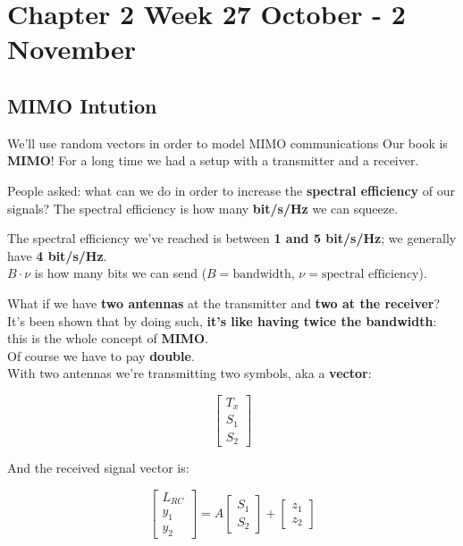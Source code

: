 \documentclass[a4paper, 11pt]{book}
\begin{document}
\setcounter{chapter}{1}
\chapter{Chapter 2 Week 27 October - 2 November}

\section{MIMO Intution}
We'll use random vectors in order to model MIMO communications
Our book is \textbf{MIMO}! For a long time we had a setup with a transmitter and a receiver.

People asked: what can we do in order to increase the \textbf{spectral efficiency} of our signals? The spectral efficiency is how many \textbf{bit/s/Hz} we can squeeze.

\noindent
\begin{minipage}{\linewidth}
\colorbox{green!20}{
\begin{minipage}{\dimexpr\linewidth-2\fboxsep\relax}
The spectral efficiency we've reached is between \textbf{1 and 5 bit/s/Hz}; we generally have \textbf{4 bit/s/Hz}.\\
$B \cdot \nu$ is how many bits we can send ($B=\text{bandwidth}$, $\nu=\text{spectral efficiency}$).
\end{minipage}
}
\end{minipage}
\vspace{0.5em}

What if we have \textbf{two antennas} at the transmitter and \textbf{two at the receiver}? It's been shown that by doing such, \textbf{it's like having twice the bandwidth}: this is the whole concept of \textbf{MIMO}.\\
Of course we have to pay \textbf{double}.\\
With two antennas we're transmitting two symbols, aka a \textbf{vector}:

$$
\left[
\begin{array}{c}
T_x \\
\hline
S_1 \\
S_2
\end{array}
\right]
$$

And the received signal vector is:

$$
\left[
\begin{array}{c}
L_{RC} \\
\hline
y_1 \\
y_2
\end{array}
\right] = A \left[
\begin{array}{c}
S_1 \\
S_2
\end{array}
\right] + \left[
\begin{array}{c}
z_1 \\
z_2
\end{array}
\right]
$$
\end{document}

